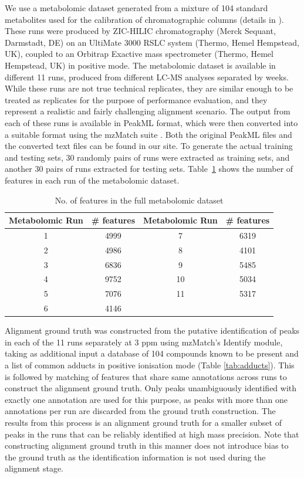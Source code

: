 We use a metabolomic dataset generated from a mixture of 104 standard metabolites used for the calibration of chromatographic columns (details in \cite{Creek2011}). These runs were produced by ZIC-HILIC chromatography (Merck Sequant, Darmstadt, DE) on an UltiMate 3000 RSLC system (Thermo, Hemel Hempstead, UK), coupled to an Orbitrap Exactive mass spectrometer (Thermo, Hemel Hempstead, UK) in positive mode. The metabolomic dataset is available in different 11 runs, produced from different LC-MS analyses separated by weeks. While these runs are not true technical replicates, they are similar enough to be treated as replicates for the purpose of performance evaluation, and they represent a realistic and fairly challenging alignment scenario. The output from each of these runs is available in PeakML format, which were then converted into a suitable format using the mzMatch suite \cite{Scheltema2011}. Both the original PeakML files and the converted text files can be found in our site. To generate the actual training and testing sets, 30 randomly pairs of runs were extracted as training sets, and another 30 pairs of runs extracted for testing sets. Table~\ref{tab:No.-of-features-metabolomic} shows the number of features in each run of the metabolomic dataset.

\begin{table}[!htbp]
\noindent \begin{centering}
\begin{tabular}{|c|c|c|c|}
\hline 
\textbf{Metabolomic Run} & \textbf{\# features} & \textbf{Metabolomic Run} & \textbf{\# features}\tabularnewline
\hline 
\hline 
1 & 4999 & 7 & 6319\tabularnewline
\hline 
2 & 4986 & 8 & 4101\tabularnewline
\hline 
3 & 6836 & 9 & 5485\tabularnewline
\hline 
4 & 9752 & 10 & 5034\tabularnewline
\hline 
5 & 7076 & 11 & 5317\tabularnewline
\hline 
6 & 4146 &  & \tabularnewline
\hline 
\end{tabular}
\par\end{centering}

\caption{No. of features in the full metabolomic dataset\label{tab:No.-of-features-metabolomic}}
\end{table}

Alignment ground truth was constructed from the putative identification of peaks in each of the 11 runs separately at 3 ppm using mzMatch's Identify module, taking as additional input a database of 104 compounds known to be present and a list of common adducts in positive ionisation mode (Table \ref{tab:adducts}). This is followed by matching of features that share same annotations across runs to construct the alignment ground truth. Only peaks unambiguously identified with exactly one annotation are used for this purpose, as peaks with more than one annotations per run are discarded from the ground truth construction. The results from this process is an alignment ground truth for a smaller subset of peaks in the runs that can be reliably identified at high mass precision. Note that constructing alignment ground truth in this manner does not introduce bias to the ground truth as the identification information is not used during the alignment stage.

